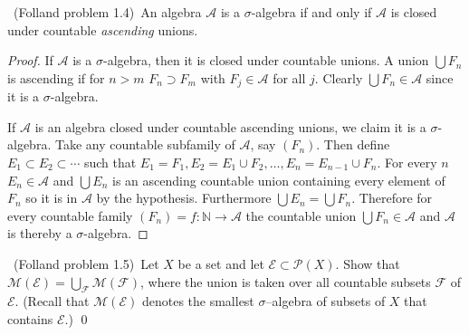 \documentclass[11pt]{amsart}
\def\scriptf{{\mathcal F}}
\def\scriptm{{\mathcal M}}
\def\scripte{{\mathcal E}}
\def\scripta{{\mathcal A}}
\def\scriptp{{\mathcal P}}
\begin{document}
\medskip {}\ 
(Folland problem 1.4)\
An algebra $\scripta$ is a $\sigma$-algebra if and only if $\scripta$
is closed under countable {\em ascending} unions.
\begin{proof}
	If $\scripta$ is a $\sigma$-algebra, then it is closed under countable unions. A union $\bigcup F_n$ is ascending if for $n > m$ $F_n \supset F_m$ with $F_j \in \scripta$ for all $j.$ 
	Clearly $\bigcup F_n \in \scripta$ since it is a $\sigma$-algebra.

	If $\scripta$ is an algebra closed under countable ascending unions, we claim it is a $\sigma$-algebra. Take any countable subfamily of $\scripta$, say $(F_n)$. Then define $E_1 \subset E_2 \subset \cdots$ such that $E_1 = F_1, E_2 = E_1 \cup F_2, \dots, E_n = E_{n-1} \cup F_n$. For every $n$ $E_n \in \scripta$ and $\bigcup E_n$ is an ascending countable union containing every element of $F_n$ so it is in $\scripta$ by the hypothesis.  Furthermore $\bigcup E_n = \bigcup F_n.$ Therefore for every countable family $(F_n) = f:\mathbb{N} \to \scripta$ the countable union $\bigcup F_n \in \scripta$ and $\scripta$ is thereby a $\sigma$-algebra.
\end{proof}

\medskip {}\ 
(Folland problem 1.5)\
Let $X$ be a set and let $\scripte\subset\scriptp(X)$.
Show that $\scriptm(\scripte) = \bigcup_\scriptf \scriptm(\scriptf)$,
where the union is taken over all countable subsets $\scriptf$ of $\scripte$.
(Recall that $\scriptm(\scripte)$ denotes the smallest $\sigma$--algebra
of subsets of $X$ that contains $\scripte$.)
\qed
\end{document}
